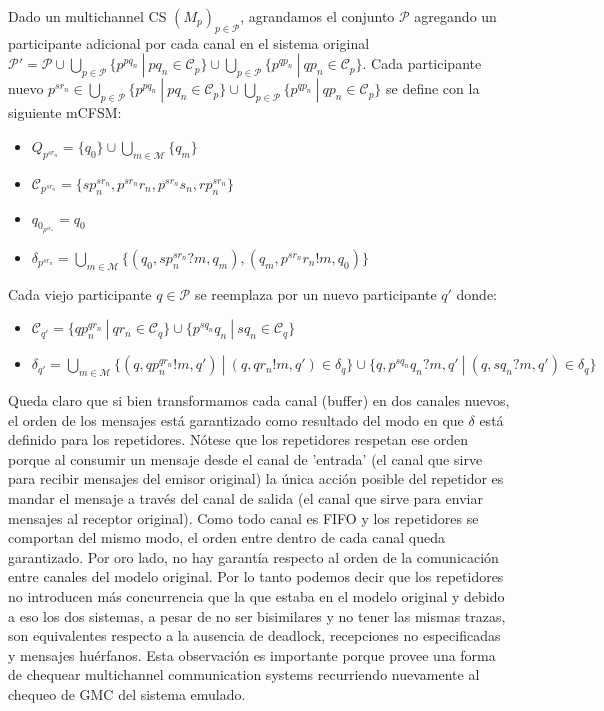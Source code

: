 \begin{definition} Dado un multichannel CS $(M_p)_{p \in \mathcal{P}}$, agrandamos el conjunto $ \mathcal{P}$ agregando un participante adicional por cada canal en el sistema original $\mathcal{P}'=\mathcal{P} \cup \bigcup_{p \in \mathcal{P}} \{p^{pq_n} \ | \ pq_n \in \mathcal{C}_p \} \cup \bigcup_{p \in \mathcal{P}} \{p^{qp_n} \ | \ qp_n \in \mathcal{C}_p \}$. Cada participante nuevo $p^{sr_n} \in \bigcup_{p \in \mathcal{P}} \{p^{pq_n} \ | \ pq_n \in \mathcal{C}_p \} \cup \bigcup_{p \in \mathcal{P}} \{p^{qp_n} \ | \ qp_n \in \mathcal{C}_p \}$ se define con la siguiente mCFSM:
\begin{itemize}
\item $Q_{p^{sr_n}} = \{q_0\} \cup \bigcup_{m \in \mathcal{M}} \{q_m\}$
\item $\mathcal{C}_{p^{sr_n}} = \{sp_n^{sr_n}, p^{sr_n}r_n,  p^{sr_n}s_n, rp_n^{sr_n} \}$
\item $q_{0_{p^{sr_n}}} = q_0 $
\item $ \delta_{p^{sr_n}} = \bigcup_{m \in \mathcal{M}} \{ (q_0,sp_n^{sr_n}?m,q_m),(q_m,p^{sr_n}r_n!m,q_0)  \} $
\end{itemize}
Cada viejo participante $q \in \mathcal{P}$ se reemplaza por un nuevo participante $q'$ donde:
\begin{itemize}
\item $\mathcal{C}_{q'} = \{qp_n^{qr_n} \ | \ qr_n \in \mathcal{C}_{q} \} \cup \{p^{sq_n}q_n \ | \ sq_n \in \mathcal{C}_{q} \}$ 
\item $ \delta_{q'} = \bigcup_{m \in \mathcal{M}} \{ (q, qp_n^{qr_n}!m, q') \ | \ (q, qr_n!m, q') \in \delta_q \} \cup \{q, p^{sq_n}q_n?m,q' \ | \ (q, sq_n?m, q') \in \delta_q \}$

\end{itemize}
\end{definition} 

Queda claro que si bien transformamos cada canal (buffer) en dos canales nuevos, el orden de los mensajes está garantizado como resultado del modo en que $\delta$ está definido para los repetidores. Nótese que los repetidores respetan ese orden porque al consumir un mensaje desde el canal de 'entrada' (el canal que sirve para recibir mensajes del emisor original) la única acción posible del repetidor es mandar el mensaje a través del canal de salida (el canal que sirve para enviar mensajes al receptor original). Como todo canal es FIFO y los repetidores se comportan del mismo modo, el orden entre dentro de cada canal queda garantizado. Por oro lado, no hay garantía respecto al orden de la comunicación entre canales del modelo original. Por lo tanto podemos decir que los repetidores no introducen más concurrencia que la que estaba en el modelo original y debido a eso los dos sistemas, a pesar de no ser bisimilares y no tener las mismas trazas, son equivalentes respecto a la ausencia de deadlock, recepciones no especificadas y mensajes huérfanos. Esta observación es importante porque provee una forma de chequear multichannel communication systems recurriendo nuevamente al chequeo de GMC del sistema emulado.

